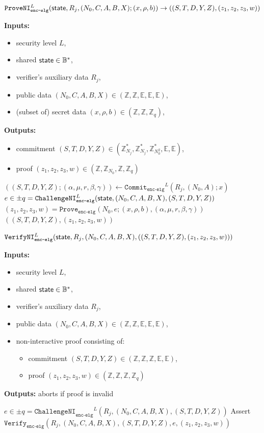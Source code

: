 \documentclass[11pt]{article}
\newenvironment{inlineAlgorithm}{}{}
\newcommand{\algoName}[1]{#1 \par}
\newcommand{\algoInputsList}[1]{
    {\small \bf Inputs:} 
        \begin{itemize}[noitemsep,topsep=0pt]
            #1
        \end{itemize}
}
\newcommand{\algoOutputs}[1]{
    {\small \bf Outputs:} #1 \par
}
\newcommand{\algoOutputsList}[1]{
    {\small \bf Outputs:}
        \begin{itemize}[noitemsep,topsep=0pt]
            #1
        \end{itemize}
}
\def\state{{\sf state}}
\newcommand{\commit}[1]{\ensuremath{\mathtt{Commit}_{\mathtt{#1}}}}
\newcommand{\challengeni}[1]{\ensuremath{\mathtt{ChallengeNI}_{\mathtt{#1}}}}
\newcommand{\prove}[1]{\ensuremath{\mathtt{Prove}_{\mathtt{#1}}}}
\newcommand{\proveni}[1]{\ensuremath{\mathtt{ProveNI}_{\mathtt{#1}}}}
\newcommand{\verify}[1]{\ensuremath{\mathtt{Verify}_{\mathtt{#1}}}}
\newcommand{\verifyni}[1]{\ensuremath{\mathtt{VerifyNI}_{\mathtt{#1}}}}
\newcommand{\E}{\mathbb{E}}
\newcommand{\Z}{\mathbb{Z}}
\newcommand{\?}[1]{\stackrel{?}{#1}}
\newcommand{\Byte}{\ensuremath{\mathbb{B}}}
\begin{document}
\begin{description}

\item
\begin{inlineAlgorithm}
\algoName{$\proveni{enc\mbox{-}elg}^L(\state, R_j, (N_0, C, A, B, X); (x, \rho, b)) \to (
    (S, T, D, Y, Z),
    (z_1, z_2, z_3, w)
)$}
\algoInputsList{
    \item security level $L$,
    \item shared $\state \in \Byte^*$,
    \item verifier's auxiliary data $R_j$,
    \item public data $(N_0, C, A, B, X) \in (\Z, \Z, \E, \E, \E)$,
    \item (subset of) secret data $(x, \rho, b) \in (\Z, \Z, \Z_q)$,
}
\algoOutputsList{
    \item commitment $(S, T, D, Y, Z) \in (\Z^*_{N_j}, \Z^*_{N_j}, \Z^*_{N^2_0}, \E, \E)$,
    \item proof $(z_1, z_2, z_3, w) \in (\Z, \Z_{N_0}, \Z, \Z_q)$
}
\begin{algorithmic}[1]
\State $((S, T, D, Y, Z); (\alpha, \mu, r, \beta, \gamma))
    \gets \commit{enc\mbox{-}elg}^L(R_j, (N_0, A); x)$
\State $e \in \pm q = \challengeni{enc\mbox{-}elg}^L(\state, (N_0, C, A, B, X), (S, T, D, Y, Z))$
\State $(z_1, z_2, z_3, w)
    = \prove{enc\mbox{-}elg}(N_0, e; (x, \rho, b), (\alpha, \mu, r, \beta, \gamma))$
\State \Return $(
    (S, T, D, Y, Z),
    (z_1, z_2, z_3, w)
)$
\end{algorithmic}
\end{inlineAlgorithm}

\item
\begin{inlineAlgorithm}
\algoName{$\verifyni{enc\mbox{-}elg}^L(\state, R_j, (N_0, C, A, B, X), (
    (S, T, D, Y, Z),
    (z_1, z_2, z_3, w)
))$}
\algoInputsList{
    \item security level $L$,
    \item shared $\state \in \Byte^*$,
    \item verifier's auxiliary data $R_j$,
    \item public data $(N_0, C, A, B, X) \in (\Z, \Z, \E, \E, \E)$,
    \item non-interactive proof consisting of:
        \begin{itemize}
        \item commitment $(S, T, D, Y, Z) \in (\Z, \Z, \Z, \E, \E)$,
        \item proof $(z_1, z_2, z_3, w) \in (\Z, \Z, \Z, \Z_q)$
        \end{itemize}
}
\algoOutputs{aborts if proof is invalid}
\begin{algorithmic}[1]
\State $e \in \pm q = \challengeni{enc\mbox{-}elg}^L(R_j, (N_0, C, A, B, X), (S, T, D, Y, Z))$
\State Assert $\verify{enc\mbox{-}elg}(R_j, (N_0, C, A, B, X), (S, T, D, Y, Z), e, (z_1, z_2, z_3, w))$
\end{algorithmic}
\end{inlineAlgorithm}

\end{description}
\end{document}
